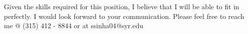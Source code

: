 \documentclass[11pt,letterpaper,sans]{moderncv}        %
\begin{document}
Given the skills required for this position, I believe that I will be able to fit in perfectly. I would look forward to your communication. Please feel free to reach me @ (315) 412 - 8844 or at ssinha04@syr.edu
\newline
\newline
\newline
\makeletterclosing
\end{document}
